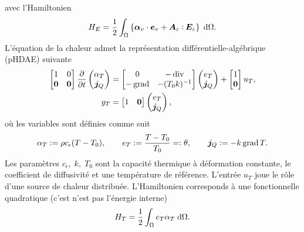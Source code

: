 avec l'Hamiltonien
\[
H_E = \energy{\bm{\alpha}_v \cdot \bm{e}_v + \bm{A}_{\varepsilon} \cddot \bm{E}_{\varepsilon}}.
\]
L'équation de la chaleur admet la représentation différentielle-algébrique (pHDAE) suivante
\begin{equation*}
\begin{aligned}
\begin{bmatrix}
1 & 0 \\
\bm{0} & \bm{0} \\
\end{bmatrix}
\diffp{}{t}
\begin{pmatrix}
\alpha_T \\
\bm{j}_Q \\
\end{pmatrix} &= 
\begin{bmatrix}
0 & -\div \\
-\grad & -(T_0 k)^{-1} \\
\end{bmatrix}
\begin{pmatrix}
e_T \\
\bm{j}_Q \\
\end{pmatrix} + 
\begin{bmatrix}
1 \\
\bm{0} \\
\end{bmatrix} u_T, \\
y_T &= \begin{bmatrix}
1 & \bm{0} \\
\end{bmatrix} \begin{pmatrix}
e_T \\
\bm{j}_Q \\
\end{pmatrix},
\end{aligned}
\end{equation*} 
où les variables sont définies comme suit
\begin{equation*}
\alpha_T := \rho c_\epsilon (T-T_0), \qquad e_T := \frac{T-T_0}{T_0} =: \theta, \qquad \bm{j}_Q := -k \operatorname*{grad} T.
\end{equation*}
Les paramètres $c_\epsilon, \; k, \; T_0$ sont la capacité thermique à déformation constante, le coefficient de diffusivité et une température de référence.
L'entrée $u_T$ joue le rôle d'une source de chaleur distribuée. L'Hamiltonien corresponds à une fonctionnelle quadratique (c'est n'est pas l'énergie interne)
\begin{equation*}
H_T = \frac{1}{2}\int_\Omega {e}_T {\alpha}_T \d\Omega.
\end{equation*}
